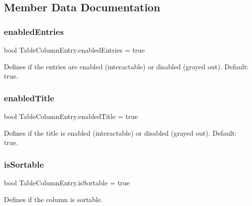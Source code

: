 \subsection{Member Data Documentation}
\mbox{\label{class_table_column_entry_a67b708efeb53404a92acd14d3d835be5}} 
\subsubsection{\texorpdfstring{enabled\+Entries}{enabledEntries}}
{\footnotesize\ttfamily bool Table\+Column\+Entry.\+enabled\+Entries = true}



Defines if the entries are enabled (interactable) or disabled (grayed out). Default\+: true. 

\mbox{\label{class_table_column_entry_ad861d6d58bae1518e32a3a9351effbb7}} 
\subsubsection{\texorpdfstring{enabled\+Title}{enabledTitle}}
{\footnotesize\ttfamily bool Table\+Column\+Entry.\+enabled\+Title = true}



Defines if the title is enabled (interactable) or disabled (grayed out). Default\+: true. 

\mbox{\label{class_table_column_entry_ac15f6f79fd208e7d3cf25d38e94c2b24}} 
\subsubsection{\texorpdfstring{is\+Sortable}{isSortable}}
{\footnotesize\ttfamily bool Table\+Column\+Entry.\+is\+Sortable = true}



Defines if the column is sortable. 


